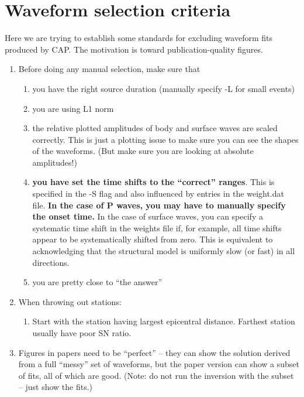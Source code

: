 \section{Waveform selection criteria}

Here we are trying to establish some standards for excluding waveform fits produced by CAP. The motivation is toward publication-quality figures.

\begin{enumerate}

\item Before doing any manual selection, make sure that
\begin{enumerate}
\item you have the right source duration (manually specify -L for small events)
\item you are using L1 norm
\item the relative plotted amplitudes of body and surface waves are scaled correctly. This is just a plotting issue to make sure you can see the shapes of the waveforms. (But make sure you are looking at absolute amplitudes!)
\item {\bf you have set the time shifts to the ``correct'' ranges}. This is specified in the -S flag and also influenced by entries in the weight.dat file. {\bf In the case of P waves, you may have to manually specify the onset time.} In the case of surface waves, you can specify a systematic time shift in the weights file if, for example, all time shifts appear to be systematically shifted from zero. This is equivalent to acknowledging that the structural model is uniformly slow (or fast) in all directions.
\item you are pretty close to ``the answer''
\end{enumerate}

\item When throwing out stations:
%
\begin{enumerate}
\item Start with the station having largest epicentral distance. Farthest station usually have poor SN ratio. 
\end{enumerate}

\item Figures in papers need to be ``perfect'' -- they can show the solution derived from a full ``messy'' set of waveforms, but the paper version can show a subset of fits, all of which are good. (Note: do not run the inversion with the subset -- just show the fits.)


\end{enumerate}
